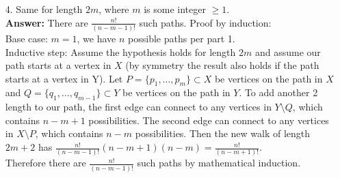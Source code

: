 \documentclass{article}
\begin{document}
\begin{itemize}
\begin{itemize}
              \item [4.] Same for length $2m$, where $m$ is some integer $\geq 1$.\\\textbf{Answer: } There are $\frac{n!}{(n-m-1)!}$ such paths. Proof by induction:\\Base case: $m=1$, we have $n$ possible paths per part 1.\\Inductive step: Assume the hypothesis holds for length $2m$ and assume our path starts at a vertex in $X$ (by symmetry the result also holds if the path starts  at a vertex in Y). Let $P=\{p_1,\ldots,p_m\}\subset X$ be vertices on the path in $X$ and $Q=\{q_1,\ldots,q_{m-1}\}\subset Y$ be vertices on the path in $Y$. To add another 2 length to our path, the first edge can connect to any vertices in $Y\setminus Q$, which contains $n-m+1$ possibilities. The second edge can connect to any vertices in $X\setminus P$, which contains $n-m$ possibilities. Then the new walk of length $2m+2$ has $\frac{n!}{(n-m-1)!}(n-m+1)(n-m)=\frac{n!}{(n-m+1)!}$.\\Therefore there are $\frac{n!}{(n-m-1)!}$ such paths by mathematical induction.
          \end{itemize}
\end{itemize}
\end{document}
